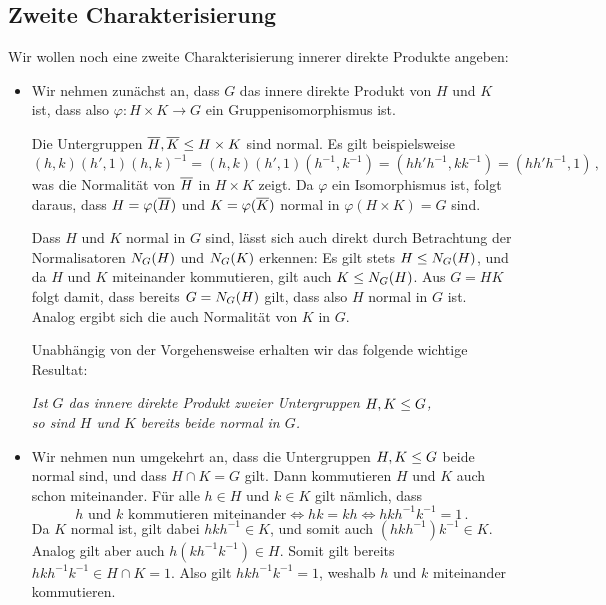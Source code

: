 \subsection*{Zweite Charakterisierung}

Wir wollen noch eine zweite Charakterisierung innerer direkte Produkte angeben:

\begin{itemize}
  \item
    Wir nehmen zunächst an, dass $G$ das innere direkte Produkt von $H$ und $K$ ist, dass also $\varphi \colon H \times K \to G$ ein Gruppenisomorphismus ist.
    
    Die Untergruppen $\induced{H}, \induced{K} \subgroup H \times K$ sind normal.
    Es gilt beispielsweise
    \[
          (h, k) (h', 1) (h, k)^{-1}
      =   (h, k) (h', 1) (h^{-1}, k^{-1})
      =   (h h' h^{-1}, k k^{-1})
      =   (h h' h^{-1}, 1) \,,
    \]
    was die Normalität von $\induced{H}$ in $H \times K$ zeigt.
    Da $\varphi$ ein Isomorphismus ist, folgt daraus, dass $H = \varphi(\induced{H})$ und $K = \varphi(\induced{K})$ normal in $\varphi(H \times K) = G$ sind.
    
    Dass $H$ und $K$ normal in $G$ sind, lässt sich auch direkt durch Betrachtung der Normalisatoren $\normalizer{H}{G}$ und $\normalizer{K}{G}$ erkennen:
    Es gilt stets $H \subgroup \normalizer{H}{G}$, und da $H$ und $K$ miteinander kommutieren, gilt auch $K \subgroup \normalizer{H}{G}$.
    Aus $G = HK$ folgt damit, dass bereits $G = \normalizer{H}{G}$ gilt, dass also $H$ normal in $G$ ist.
    Analog ergibt sich die auch Normalität von $K$ in $G$.
    
    Unabhängig von der Vorgehensweise erhalten wir das folgende wichtige Resultat:
    \begin{center}
      \emph{
      Ist $G$ das innere direkte Produkt zweier Untergruppen $H, K \subgroup G$,\\
      so sind $H$ und $K$ bereits beide normal in $G$.
      }
    \end{center}
  \item
    Wir nehmen nun umgekehrt an, dass die Untergruppen $H, K \subgroup G$ beide normal sind, und dass $H \cap K = G$ gilt.
    Dann kommutieren $H$ und $K$ auch schon miteinander.
    Für alle $h \in H$ und $k \in K$ gilt nämlich, dass
    \[
            \text{$h$ und $k$ kommutieren miteinander}
      \iff  hk = kh
      \iff  h k h^{-1} k^{-1} = 1 \,.
    \]
    Da $K$ normal ist, gilt dabei $h k h^{-1} \in K$, und somit auch $(h k h^{-1}) k^{-1} \in K$.
    Analog gilt aber auch $h (k h^{-1} k^{-1}) \in H$.
    Somit gilt bereits $h k h^{-1} k^{-1} \in H \cap K = 1$.
    Also gilt $h k h^{-1} k^{-1} = 1$, weshalb $h$ und $k$ miteinander kommutieren.
\end{itemize}

